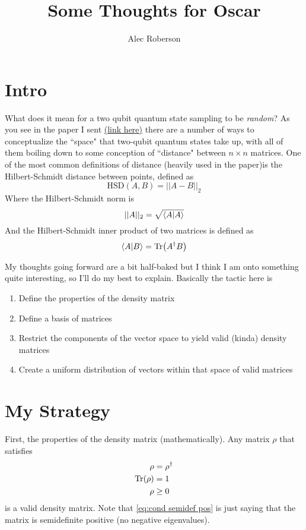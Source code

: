 \documentclass{paper}[11pt]
\title{Some Thoughts for Oscar}
\author{Alec Roberson}
\begin{document}
	\maketitle
	
	\section*{Intro}
	
	What does it mean for a two qubit quantum state sampling to be \textit{random}? As you see in the paper I sent \href{https://link.springer.com/article/10.1007/s13538-015-0367-2}{(link here)} there are a number of ways to conceptualize the ``space" that two-qubit quantum states take up, with all of them boiling down to some conception of ``distance" between $n\times n$ matrices. One of the most common definitions of distance (heavily used in the paper)is the Hilbert-Schmidt distance between points, defined as
	\begin{equation}
		\text{HSD}(A, B) = ||A-B||_2
	\end{equation}
	Where the Hilbert-Schmidt norm is
	\begin{equation}
		||A||_2 = \sqrt{\braket{A}{A}}
	\end{equation}
	And the Hilbert-Schmidt inner product of two matrices is defined as
	\begin{equation}
		\braket{A}{B} = \Tr(A^\dagger B)
	\end{equation}
	
	My thoughts going forward are a bit half-baked but I think I am onto something quite interesting, so I'll do my best to explain. Basically the tactic here is
	\begin{enumerate}
		\item Define the properties of the density matrix
		\item Define a basis of matrices
		\item Restrict the components of the vector space to yield valid (kinda) density matrices
		\item Create a uniform distribution of vectors within that space of valid matrices
	\end{enumerate}
	
	\section*{My Strategy}
	
	First, the properties of the density matrix (mathematically). Any matrix $\rho$ that satisfies
	\begin{align}
		\rho &= \rho^\dagger \label{eq:cond hermit}\\
		\Tr(\rho) &= 1 \label{eq:cond tr one}\\
		\rho &\geq 0 \label{eq:cond semidef pos}
	\end{align}
	is a valid density matrix. Note that \cref{eq:cond semidef pos} is just saying that the matrix is semidefinite positive (no negative eigenvalues).
	
\end{document}
